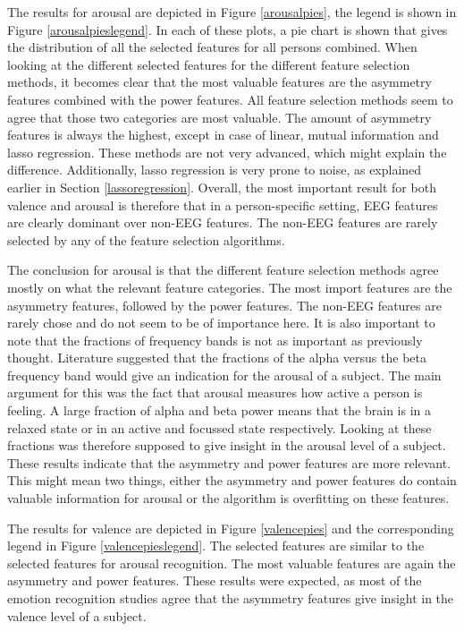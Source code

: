 The results for arousal are depicted in Figure \ref{arousalpies}, the legend is shown in Figure \ref{arousalpieslegend}. In each of these plots, a pie chart is shown that gives the distribution of all the selected features for all persons combined. When looking at the different selected features for the different feature selection methods, it becomes clear that the most valuable features are the asymmetry features combined with the power features. All feature selection methods seem to agree that those two categories are most valuable. The amount of asymmetry features is always the highest, except in case of linear, mutual information and lasso regression. These methods are not very advanced, which might explain the difference. Additionally, lasso regression is very prone to noise, as explained earlier in Section \ref{lassoregression}. Overall, the most important result for both valence and arousal is therefore that in a person-specific setting, EEG features are clearly dominant over non-EEG features. The non-EEG features are rarely selected by any of the feature selection algorithms.

\npar

The conclusion for arousal is that the different feature selection methods agree mostly on what the relevant feature categories. The most import features are the asymmetry features, followed by the power features. The non-EEG features are rarely chose and do not seem to be of importance here. It is also important to note that the fractions of frequency bands is not as important as previously thought. Literature suggested that the fractions of the alpha versus the beta frequency band would give an indication for the arousal of a subject. The main argument for this was the fact that arousal measures how active a person is feeling. A large fraction of alpha and beta power means that the brain is in a relaxed state or in an active and focussed state respectively. Looking at these fractions was therefore supposed to give insight in the arousal level of a subject. These results indicate that the asymmetry and power features are more relevant. This might mean two things, either the asymmetry and power features do contain valuable information for arousal or the algorithm is overfitting on these features.

\npar

The results for valence are depicted in Figure \ref{valencepies} and the corresponding legend in Figure \ref{valencepieslegend}. The selected features are similar to the selected features for arousal recognition. The most valuable features are again the asymmetry and power features. These results were expected, as most of the emotion recognition studies agree that the asymmetry features give insight in the valence level of a subject.

